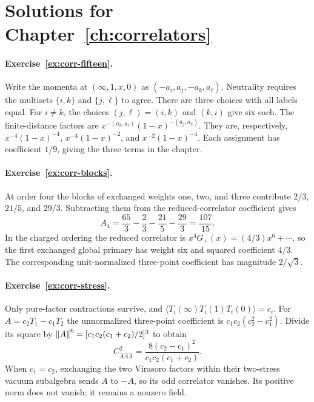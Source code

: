\section{Solutions for Chapter~\ref{ch:correlators}}

\paragraph{Exercise~\ref{ex:corr-fifteen}.}
\label{sol:ex:corr-fifteen}
Write the momenta at $(\infty,1,x,0)$ as
$(-a_i,a_j,-a_k,a_\ell)$. Neutrality requires the
multisets $\{i,k\}$ and $\{j,\ell\}$ to agree.
There are three choices with all labels equal. For $i\ne k$,
the choices $(j,\ell)=(i,k)$ and $(k,i)$ give six each.
The finite-distance factors are
$x^{-(a_k,a_\ell)}(1-x)^{-(a_j,a_k)}$.
They are, respectively,
$x^{-4}(1-x)^{-4}$,
$x^{-4}(1-x)^{-2}$, and
$x^{-2}(1-x)^{-4}$.
Each assignment has coefficient $1/9$, giving the three
terms in the chapter.



\paragraph{Exercise~\ref{ex:corr-blocks}.}
\label{sol:ex:corr-blocks}
At order four the blocks of exchanged weights one, two,
and three contribute $2/3$, $21/5$, and $29/3$.
Subtracting them from the reduced-correlator coefficient gives
\[
 A_4=\frac{65}{3}-\frac23-\frac{21}{5}-\frac{29}{3}
     =\frac{107}{15}.
\]
In the charged ordering the reduced correlator is
$x^4G_+(x)=(4/3)x^6+\cdots$, so the first exchanged
global primary has weight six and squared coefficient $4/3$.
The corresponding unit-normalized three-point coefficient
has magnitude $2/\sqrt3$.



\paragraph{Exercise~\ref{ex:corr-stress}.}
\label{sol:ex:corr-stress}
Only pure-factor contractions survive, and
$\langle T_i(\infty)T_i(1)T_i(0)\rangle=c_i$.
For $A=c_2T_1-c_1T_2$ the unnormalized three-point
coefficient is $c_1c_2(c_2^2-c_1^2)$.
Divide its square by
$\left\lVert A\right\rVert^6=[c_1c_2(c_1+c_2)/2]^3$ to obtain
\[
 C_{\widehat A\widehat A\widehat A}^2
 =\frac{8(c_2-c_1)^2}{c_1c_2(c_1+c_2)}.
\]
When $c_1=c_2$, exchanging the two Virasoro factors within their
two-stress vacuum subalgebra sends $A$ to $-A$, so its odd
correlator vanishes. Its positive norm
does not vanish; it remains a nonzero field.



